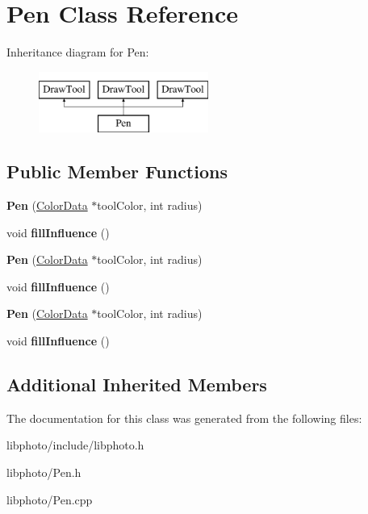 \hypertarget{classPen}{\section{Pen Class Reference}
\label{classPen}
}
Inheritance diagram for Pen\-:\begin{figure}[H]
\begin{center}
\leavevmode
\includegraphics[height=2.000000cm]{classPen}
\end{center}
\end{figure}
\subsection*{Public Member Functions}
\begin{DoxyCompactItemize}
\item 
\hypertarget{classPen_aae1e2ae7aead4ede7484af6554fd93d7}{{\bfseries Pen} (\hyperlink{classColorData}{Color\-Data} $\ast$tool\-Color, int radius)}\label{classPen_aae1e2ae7aead4ede7484af6554fd93d7}

\item 
\hypertarget{classPen_a3a09d9bed4cefec347fb4dd759faf44a}{void {\bfseries fill\-Influence} ()}\label{classPen_a3a09d9bed4cefec347fb4dd759faf44a}

\item 
\hypertarget{classPen_aae1e2ae7aead4ede7484af6554fd93d7}{{\bfseries Pen} (\hyperlink{classColorData}{Color\-Data} $\ast$tool\-Color, int radius)}\label{classPen_aae1e2ae7aead4ede7484af6554fd93d7}

\item 
\hypertarget{classPen_a3a09d9bed4cefec347fb4dd759faf44a}{void {\bfseries fill\-Influence} ()}\label{classPen_a3a09d9bed4cefec347fb4dd759faf44a}

\item 
\hypertarget{classPen_aae1e2ae7aead4ede7484af6554fd93d7}{{\bfseries Pen} (\hyperlink{classColorData}{Color\-Data} $\ast$tool\-Color, int radius)}\label{classPen_aae1e2ae7aead4ede7484af6554fd93d7}

\item 
\hypertarget{classPen_a3a09d9bed4cefec347fb4dd759faf44a}{void {\bfseries fill\-Influence} ()}\label{classPen_a3a09d9bed4cefec347fb4dd759faf44a}

\end{DoxyCompactItemize}
\subsection*{Additional Inherited Members}


The documentation for this class was generated from the following files\-:\begin{DoxyCompactItemize}
\item 
libphoto/include/libphoto.\-h\item 
libphoto/Pen.\-h\item 
libphoto/Pen.\-cpp\end{DoxyCompactItemize}
